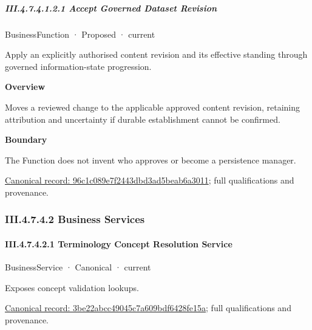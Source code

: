 \subparagraph*{III.4.7.4.1.2.1 Accept Governed Dataset Revision}
\label{navigation:III.4.7.4.1.2.1}

\label{element:96c1c089e7f2443dbd3ad5beab6a3011}
{\small BusinessFunction · Proposed · current}\par

Apply an explicitly authorised content revision and its effective standing through governed information-state progression.



\textbf{Overview}



Moves a reviewed change to the applicable approved content revision, retaining attribution and uncertainty if durable establishment cannot be confirmed.



\textbf{Boundary}



The Function does not invent who approves or become a persistence manager.


{\footnotesize \href{../../../../continuum/business/business-function/96c1c089e7f2443dbd3ad5beab6a3011.md}{Canonical record: 96c1c089e7f2443dbd3ad5beab6a3011}; full qualifications and provenance.}\par
\subsubsection*{III.4.7.4.2 Business Services}
\label{navigation:III.4.7.4.2}

\paragraph*{III.4.7.4.2.1 Terminology Concept Resolution Service}
\label{navigation:III.4.7.4.2.1}

\label{element:3be22abcc49045c7a609bdf6428fe15a}
{\small BusinessService · Canonical · current}\par

Exposes concept validation lookups.


{\footnotesize \href{../../../../continuum/business/business-service/3be22abcc49045c7a609bdf6428fe15a.md}{Canonical record: 3be22abcc49045c7a609bdf6428fe15a}; full qualifications and provenance.}\par
